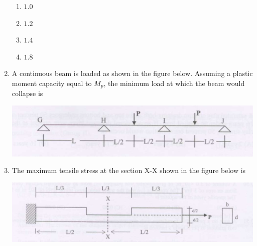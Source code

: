 \documentclass[journal]{IEEEtran}
\begin{document}
\begin{enumerate}
\begin{enumerate}
\item $1.0$
\item $1.2$
\item $1.4$
\item $1.8$
\end{enumerate}

\item A continuous beam is loaded as shown in the figure below. Assuming a plastic moment capacity equal to $M_p$, the minimum load at which the beam would collapse is \hfill {}

\includegraphics[width=\columnwidth]{figs/fig1.png} 
\begin{enumerate}
\end{enumerate}

\item The maximum tensile stress at the section X-X shown in the figure below is \hfill {}

\includegraphics[width=\columnwidth]{figs/fig2.png} 
\begin{enumerate}
\end{enumerate}


\end{enumerate}
\end{document}
